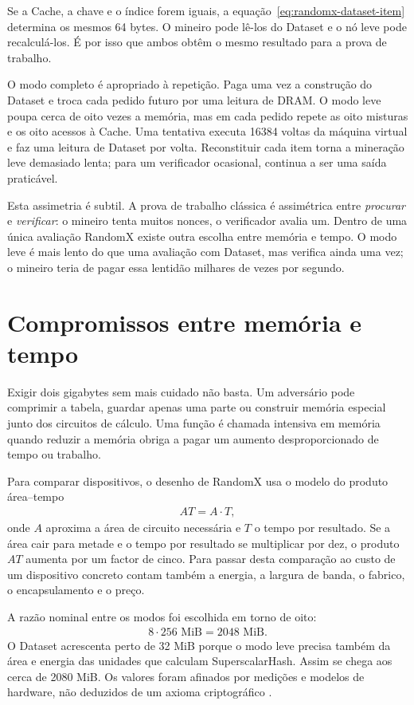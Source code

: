 Se a Cache, a chave e o índice forem iguais, a
equação~\eqref{eq:randomx-dataset-item} determina os mesmos 64 bytes.
O mineiro pode lê-los do Dataset e o nó leve pode recalculá-los.
É por isso que ambos obtêm o mesmo resultado para a prova de trabalho.

O modo completo é apropriado à repetição. Paga uma vez a construção do
Dataset e troca cada pedido futuro por uma leitura de DRAM. O modo leve poupa
cerca de oito vezes a memória, mas em cada pedido repete as oito misturas e os
oito acessos à Cache. Uma tentativa executa 16384 voltas da máquina virtual e
faz uma leitura de Dataset por volta. Reconstituir cada item torna a mineração
leve demasiado lenta; para um verificador ocasional, continua a ser uma saída
praticável.

Esta assimetria é subtil. A prova de trabalho clássica é assimétrica entre
\emph{procurar} e \emph{verificar}: o mineiro tenta muitos nonces, o
verificador avalia um. Dentro de uma única avaliação RandomX existe outra
escolha entre memória e tempo. O modo leve é mais lento do que uma avaliação
com Dataset, mas verifica ainda uma vez; o mineiro teria de pagar essa lentidão
milhares de vezes por segundo.


\section{Compromissos entre memória e tempo}
\label{sec:randomx-memory-hardness}

Exigir dois gigabytes sem mais cuidado não basta. Um adversário pode comprimir
a tabela, guardar apenas uma parte ou construir memória especial junto dos
circuitos de cálculo. Uma função é chamada intensiva em memória quando reduzir
a memória obriga a pagar um aumento desproporcionado de tempo ou trabalho.

Para comparar dispositivos, o desenho de RandomX usa o modelo do produto
área--tempo
\begin{align}
 AT=A\cdot T,
 \label{eq:randomx-area-time}
\end{align}
onde \(A\) aproxima a área de circuito necessária e \(T\) o tempo por
resultado. Se a área cair para metade e o tempo por resultado se multiplicar
por dez, o produto \(AT\) aumenta por um factor de cinco.
Para passar desta comparação ao custo de um dispositivo concreto contam
também a energia, a largura de banda, o fabrico, o encapsulamento e o preço.

A razão nominal entre os modos foi escolhida em torno de oito:
\begin{align*}
 8\cdot256\text{ MiB}=2048\text{ MiB}.
\end{align*}
O Dataset acrescenta perto de 32 MiB porque o modo leve precisa também da área
e energia das unidades que calculam SuperscalarHash. Assim se chega aos cerca
de 2080 MiB. Os valores foram afinados por medições e modelos de hardware, não
deduzidos de um axioma criptográfico \cite{randomx-design-v1}.

